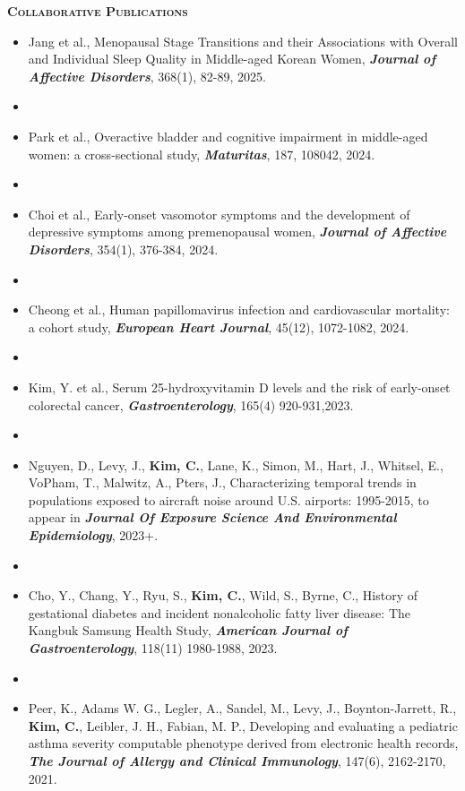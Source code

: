 \documentclass[10pt]{article}
\newenvironment{innerlist}[1][\enskip\textbullet]%
        {\begin{itemize}[#1,leftmargin=*,parsep=0pt,itemsep=0pt,topsep=0pt,partopsep=0pt]}
        {\end{itemize}}
\begin{document}
\bigskip

\textsc{\bf Collaborative Publications}
\smallskip
\begin{innerlist}
\item[] Jang et al., Menopausal Stage Transitions and their Associations with Overall and Individual Sleep Quality in Middle-aged Korean Women, \textbf{\textit{Journal of Affective Disorders}}, 368(1), 82-89, 2025.
\item[]
\item[] Park et al., Overactive bladder and cognitive impairment in middle-aged women: a cross-sectional study, \textbf {\textit{Maturitas}}, 187, 108042, 2024.
\item[]
    \item[] Choi et al., 
Early-onset vasomotor symptoms and the development of depressive symptoms among premenopausal women, \textbf{\textit{Journal of Affective Disorders}}, 354(1), 376-384, 2024.
\item[]
\item[] Cheong et al., Human papillomavirus infection and
cardiovascular mortality: a cohort study, \textbf {\textit{European Heart Journal}}, 45(12), 1072-1082, 2024.
\item[]
\item[] Kim, Y. et al., Serum 25-hydroxyvitamin D levels and the risk of early-onset colorectal cancer, \textbf {\textit{Gastroenterology}}, 165(4) 920-931,2023.
\item[]
\item[] Nguyen, D., Levy, J., {\bf Kim, C.}, Lane, K., Simon, M., Hart, J., Whitsel, E., VoPham, T., Malwitz, A., Pters, J., Characterizing temporal trends in populations exposed to aircraft noise around U.S. airports: 1995-2015, to appear in \textbf {\textit{Journal Of Exposure Science And Environmental Epidemiology}}, 2023+.
\item[]
\item[] Cho, Y., Chang, Y., Ryu, S., {\bf Kim, C.}, Wild, S., Byrne, C., History of gestational diabetes and incident nonalcoholic fatty liver disease: The Kangbuk Samsung Health Study, \textbf {\textit{American Journal of Gastroenterology}}, 118(11) 1980-1988, 2023.
\item[]
  \item[] Peer, K., Adams W. G., Legler, A., Sandel, M., Levy, J., Boynton-Jarrett, R.,  {\bf Kim, C.}, Leibler, J. H., Fabian, M. P., Developing and evaluating a pediatric asthma severity computable phenotype derived from electronic health records, \textbf {\textit{The Journal of Allergy and Clinical Immunology}}, 147(6), 2162-2170, 2021.

\end{innerlist}
\end{document}

